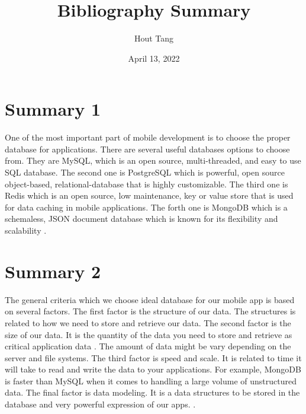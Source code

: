\documentclass{article}
\title{Bibliography Summary}
\author{Hout Tang}
\date{April 13, 2022}
\begin{document}
\maketitle

\section*{Summary 1}

One of the most important part of mobile development is to choose the proper database for applications. There are several useful databases options to choose from. They are MySQL, which is an open source, multi-threaded, and easy to use SQL database. The second one is PostgreSQL which is powerful, open source object-based, relational-database that is highly customizable. The third one is Redis which is an open source, low maintenance, key or value store that is used for data caching in mobile applications. The forth one is MongoDB which is a schemaless, JSON document database which is known for its flexibility and scalability \cite{JSArticle}.

 

\medskip

\section*{Summary 2}

The general criteria which we choose ideal database for our mobile app is based on several factors. The first factor is the structure of our data. The structures is related to how we need to store and retrieve our data. The second factor is the size of our data. It is the quantity of the data you need to store and retrieve as critical application data \cite{BCArticle}. The amount of data might be vary depending on the server and file systems. The third factor is speed and scale. It is related to time it will take to read and write the data to your applications. For example, MongoDB is faster than MySQL when it comes to handling a large volume of unstructured data. The final factor is data modeling. It is a data structures to be stored in the database and very powerful expression of our apps.
 \cite{JSArticle}.
 




\printbibliography
\end{document}
